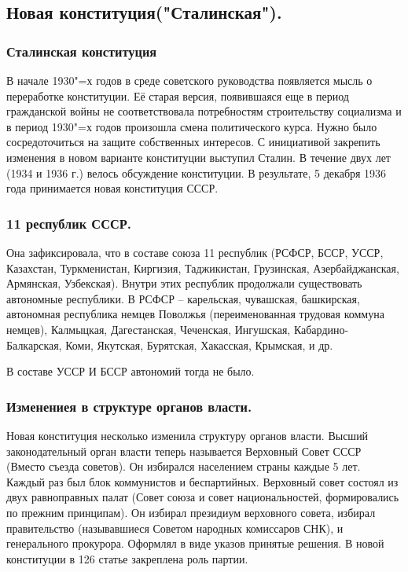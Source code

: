 \subsection{Новая конституция("Сталинская").}

\subsubsection{\textbf{Сталинская конституция}}
В начале 1930"=х годов в среде советского руководства появляется мысль о переработке конституции. Её старая версия, появившаяся еще в период гражданской войны не соответствовала потребностям строительству социализма и в период 1930"=х годов произошла смена политического курса. Нужно было сосредоточиться на защите собственных интересов. С инициативой закрепить изменения в новом варианте конституции выступил Сталин. В течение двух лет (1934 и 1936 г.) велось обсуждение конституции. В результате, 5 декабря 1936 года принимается новая конституция СССР. 

\subsubsection{\textbf{11 республик СССР.}}
Она зафиксировала, что в составе союза 11 республик (РСФСР, БССР, УССР, Казахстан, Туркменистан, Киргизия, Таджикистан, Грузинская, Азербайджанская, Армянская, Узбекская). Внутри этих республик продолжали существовать автономные республики. В РСФСР – карельская, чувашская, башкирская, автономная республика немцев Поволжья (переименованная трудовая коммуна немцев), Калмыцкая, Дагестанская, Чеченская, Ингушская, Кабардино-Балкарская, Коми, Якутская, Бурятская, Хакасская, Крымская, и др.

В составе УССР И БССР автономий тогда не было.

\subsubsection{\textbf{Изменениея в структуре органов власти.}}

Новая конституция несколько изменила структуру органов власти. Высший законодательный орган власти теперь называется Верховный Совет СССР (Вместо съезда советов). Он избирался населением страны каждые 5 лет. Каждый раз был блок коммунистов и беспартийных. Верховный совет состоял из двух равноправных палат (Совет союза и совет национальностей, формировались по прежним принципам). Он избирал президиум верховного совета, избирал правительство (называвшиеся Советом народных комиссаров СНК), и генерального прокурора. Оформлял в виде указов принятые решения.
В новой конституции в 126 статье закреплена роль партии. 

